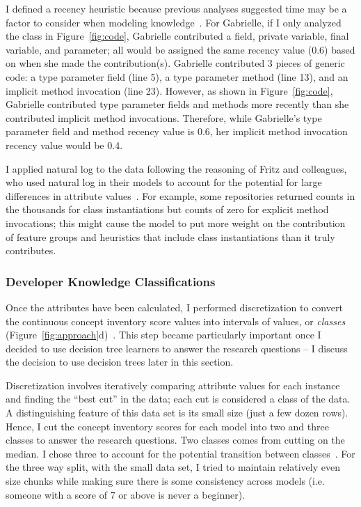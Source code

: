 I defined a recency heuristic because previous analyses suggested time may be a factor to consider when modeling knowledge~\cite{johnson2015bespoke}. 
For Gabrielle, if I only analyzed the class in Figure~\ref{fig:code}, Gabrielle contributed a field, private variable, final variable, and parameter; all would be assigned the same recency value (0.6) based on when she made the contribution(s).
Gabrielle contributed 3 pieces of generic code: a type parameter field (line 5), a type parameter method (line 13), and an implicit method invocation (line 23). However, as shown in Figure~\ref{fig:code}, Gabrielle contributed type parameter fields and methods more recently than she contributed implicit method invocations. Therefore, while Gabrielle's type parameter field and method recency value is 0.6, her implicit method invocation recency value would be 0.4.

I applied natural log to the data following the reasoning of Fritz and colleagues, who used natural log in their models to account for the potential for large differences in attribute values~\cite{fritz2010degree}. For example, some repositories returned counts in the thousands for class instantiations but counts of zero for explicit method invocations; this might cause the model to put more weight on the contribution of feature groups and heuristics that include class instantiations than it truly contributes.

\subsubsection{Developer Knowledge Classifications}
Once the attributes have been calculated, I performed discretization to convert the continuous concept inventory score values into intervals of values, or \emph{classes} (Figure~\ref{fig:approach}d)~\cite{fayyad1993multi}. This step became particularly important once I decided to use decision tree learners to answer the research questions -- I discuss the decision to use decision trees later in this section.

Discretization involves iteratively comparing attribute values for each instance and finding the ``best cut'' in the data; each cut is considered a class of the data. A distinguishing feature of this data set is its small size (just a few dozen rows). Hence, I cut the concept inventory scores for each model into two and three classes to answer the research questions. Two classes comes from cutting on the median. I chose three to account for the potential transition between classes~\cite{dreyfus2004five}. For the three way split, with the small data set, I tried to maintain relatively even size chunks while making sure there is some consistency across models (i.e. someone with a score of 7 or above is never a beginner).

